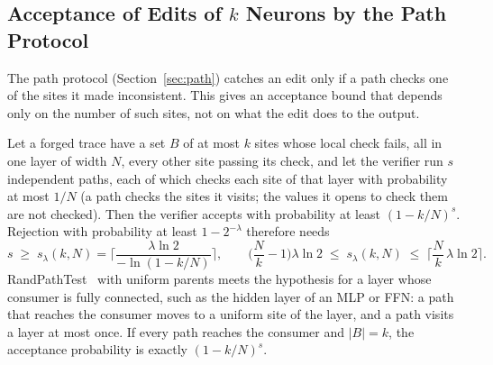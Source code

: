\subsection{Acceptance of Edits of \texorpdfstring{$k$}{k} Neurons by the Path Protocol}
\label{app:paths}

The path protocol (Section~\ref{sec:path}) catches an edit only if a path checks one of the sites it
made inconsistent. This gives an acceptance bound that depends only on the number of such sites,
not on what the edit does to the output.

\begin{proposition}
\label{prop:paths}
Let a forged trace have a set $B$ of at most $k$ sites whose local check fails, all in one layer of
width $N$, every other site passing its check, and let the verifier run $s$ independent paths, each of
which checks each site of that layer with probability at most $1/N$ (a path checks the sites it visits;
the values it opens to check them are not checked). Then the verifier accepts with
probability at least $(1-k/N)^s$. Rejection with probability at least $1-2^{-\lambda}$ therefore needs
\[
  s\;\ge\;s_\lambda(k,N)=\Big\lceil\frac{\lambda\ln2}{-\ln(1-k/N)}\Big\rceil,\qquad
  \Big(\frac Nk-1\Big)\lambda\ln2\;\le\;s_\lambda(k,N)\;\le\;\Big\lceil\frac Nk\,\lambda\ln2\Big\rceil.
\]
RandPathTest~\cite{anchuri2026verifiable} with uniform parents meets the hypothesis for a layer whose
consumer is fully connected, such as the hidden layer of an MLP or FFN: a path that reaches the
consumer moves to a uniform site of the layer, and a path visits a layer at most once. If every path
reaches the consumer and $|B|=k$, the acceptance probability is exactly $(1-k/N)^s$.
\end{proposition}

